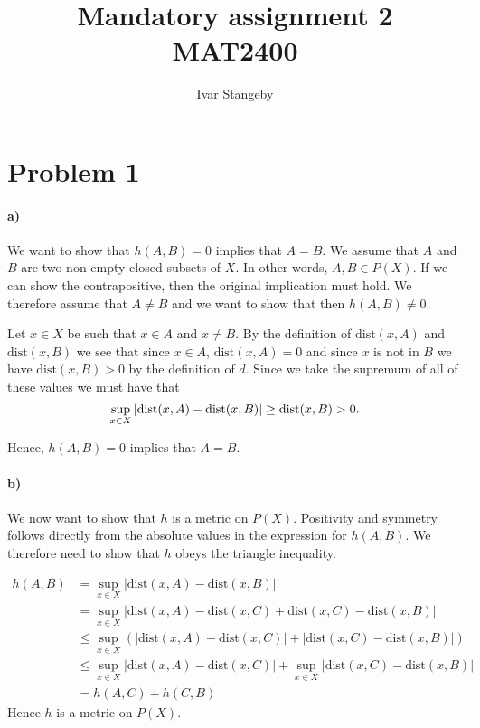 \documentclass[a4paper]{article}
\title{
  Mandatory assignment 2\\
  MAT2400
}
\author{Ivar Stangeby}
\newcommand{\dist}{\text{dist}}
\begin{document}
\maketitle
\section*{Problem 1}
\paragraph{a)}
  We want to show that $h(A, B) = 0$ implies that $A = B$. We assume that $A$
  and $B$ are two non-empty closed subsets of $X$. In other words, $A, B \in
  P(X)$.  If we can show the contrapositive, then the original implication must
  hold.  We therefore assume that $A \neq B$ and we want to show that then
  $h(A, B) \neq 0$.
  
  Let $x\in X$ be such that $x \in A$ and $x \neq B$. By the definition of
  $\dist(x, A)$ and $\dist(x, B)$ we see that since $x \in A$, $\dist(x, A) =
  0$ and since $x$ is not in $B$ we have $\dist(x, B) > 0$ by the definition of
  $d$. Since we take the supremum of all of these values we must have that
  \begin{equation}
    \notag
    \sup_{x \in X}|\dist(x, A) - \dist(x, B)| \geq \dist(x, B) > 0.
  \end{equation}

  Hence, $h(A, B) = 0$ implies that $A = B$.

\paragraph{b)}
We now want to show that $h$ is a metric on $P(X)$. Positivity and symmetry
follows directly from the absolute values in the expression for $h(A, B)$. 
We therefore need to show that $h$ obeys the triangle inequality. 

\begin{align*}
  h(A, B) &= \sup_{x \in X}|\dist(x, A) - \dist(x, B)| \\
  &= \sup_{x \in X}|\dist(x, A) - \dist(x, C) + \dist(x, C) - \dist(x, B)|\\
  &\leq \sup_{x \in X}\left(| \dist(x, A) - \dist(x, C)| + |\dist(x, C) - \dist(x, B)|\right)\\
  &\leq \sup_{x \in X}| \dist(x, A) - \dist(x, C)| + \sup_{x \in X}|\dist(x, C) - \dist(x, B)|\\
  &= h(A, C) + h(C, B)
\end{align*}
Hence $h$ is a metric on $P(X)$.
\end{document}
